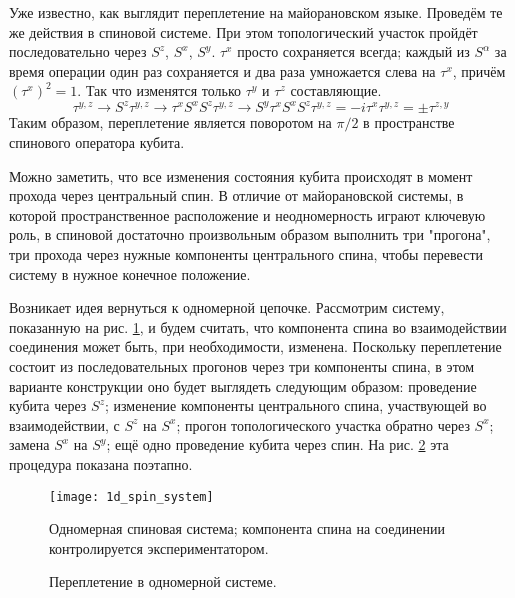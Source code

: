 \documentclass[a4paper,12pt]{article}
\theoremstyle{plain} %
\theoremstyle{definition} %
\theoremstyle{remark} %
\begin{document}
Уже известно, как выглядит переплетение на майорановском языке. Проведём те же действия в спиновой системе. При этом топологический участок пройдёт последовательно через $S^z$, $S^x$, $S^y$. $\tau^x$ просто сохраняется всегда; каждый из $S^\alpha$ за время операции один раз сохраняется и два раза умножается слева на $\tau^x$, причём $\left( \tau^x \right)^2 = 1$. Так что изменятся только $\tau^y$ и $\tau^z$ составляющие.
\begin{equation}
    \tau^{y,z} \rightarrow S^z \tau^{y,z} \rightarrow \tau^x S^x S^z \tau^{y,z} \rightarrow S^y \tau^x S^x S^z \tau^{y,z} = -i \tau^x \tau^{y,z} = \pm \tau^{z,y}
\end{equation}
Таким образом, переплетение является поворотом на $\pi/2$ в пространстве спинового оператора кубита.

Можно заметить, что все изменения состояния кубита происходят в момент прохода через центральный спин. В отличие от майорановской системы, в которой пространственное расположение и неодномерность играют ключевую роль, в спиновой достаточно произвольным образом выполнить три "прогона"$ $, три прохода через нужные компоненты центрального спина, чтобы перевести систему в нужное конечное положение.

Возникает идея вернуться к одномерной цепочке. Рассмотрим систему, показанную на рис. \ref{fig:1d_spin_system}, и будем считать, что компонента спина во взаимодействии соединения может быть, при необходимости, изменена. Поскольку переплетение состоит из последовательных прогонов через три компоненты спина, в этом варианте конструкции оно будет выглядеть следующим образом: проведение кубита через $S^z$; изменение компоненты центрального спина, участвующей во взаимодействии, с $S^z$ на $S^x$; прогон топологического участка обратно через $S^x$; замена $S^x$ на $S^y$; ещё одно проведение кубита через спин. На рис. \ref{fig:1d_braiding} эта процедура показана поэтапно.

\begin{figure}
    \centering
    \texttt{[image: 1d\_spin\_system]}
    \caption{Одномерная спиновая система; компонента спина на соединении контролируется экспериментатором.}
    \label{fig:1d_spin_system}
\end{figure}

\begin{figure}
    \centering
    \captionsetup[subfigure]{justification=centering}
    \caption{Переплетение в одномерной системе.}
    \label{fig:1d_braiding}
\end{figure}
\end{document}
